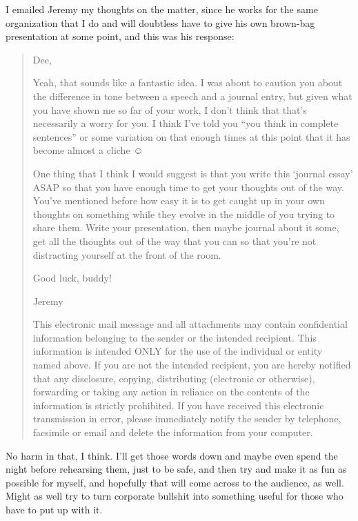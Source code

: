 I emailed Jeremy my thoughts on the matter, since he works for the same organization that I do and will doubtless have to give his own brown-bag presentation at some point, and this was his response:

\begin{quote}
Dee,

Yeah, that sounds like a fantastic idea. I was about to caution you about the difference in tone between a speech and a journal entry, but given what you have shown me so far of your work, I don't think that that's necessarily a worry for you. I think I've told you ``you think in complete sentences'' or some variation on that enough times at this point that it has become almost a cliche ☺

One thing that I think I would suggest is that you write this `journal essay' ASAP so that you have enough time to get your thoughts out of the way. You've mentioned before how easy it is to get caught up in your own thoughts on something while they evolve in the middle of you trying to share them. Write your presentation, then maybe journal about it some, get all the thoughts out of the way that you can so that you're not distracting yourself at the front of the room.

Good luck, buddy!

Jeremy

This electronic mail message and all attachments may contain confidential information belonging to the sender or the intended recipient. This information is intended ONLY for the use of the individual or entity named above. If you are not the intended recipient, you are hereby notified that any disclosure, copying, distributing (electronic or otherwise), forwarding or taking any action in reliance on the contents of the information is strictly prohibited. If you have received this electronic transmission in error, please immediately notify the sender by telephone, facsimile or email and delete the information from your computer.
\end{quote}

No harm in that, I think. I'll get those words down and maybe even spend the night before rehearsing them, just to be safe, and then try and make it as fun as possible for myself, and hopefully that will come across to the audience, as well. Might as well try to turn corporate bullshit into something useful for those who have to put up with it.

\section{}

